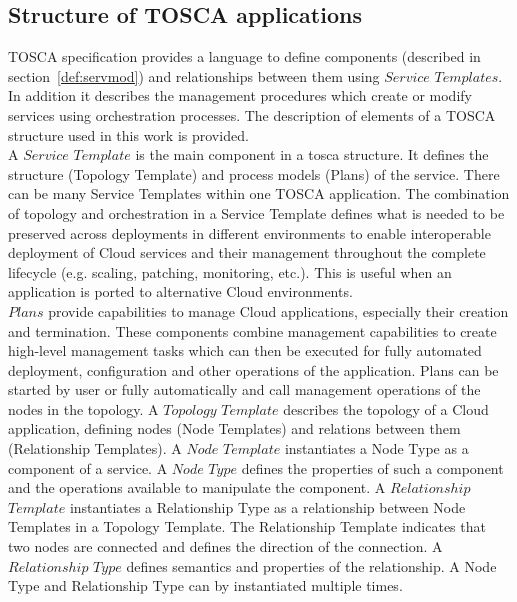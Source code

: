 \subsection*{Structure of TOSCA applications}
TOSCA specification provides a language to define components (described in section~\ref{def:servmod}) and relationships between them using $Service$ $Templates$. 
In addition it describes the management procedures which create or modify services using orchestration processes.
The description of elements of a TOSCA structure used in this work is provided. \\
A $Service$ $Template$ is the main component in a \gls{tosca} structure. 
It defines the structure (Topology Template) and process models (Plans) of the service. 
There can be many Service Templates within one TOSCA application.
The combination of topology and orchestration in a Service Template defines what is needed to be preserved across deployments in different environments to enable interoperable deployment of Cloud services and their management throughout the complete lifecycle (e.g. scaling, patching, monitoring, etc.).
This is useful when an application is ported to alternative Cloud environments.~\cite{TOSCA-v1.0_book} \\ %
$Plans$ provide capabilities to manage Cloud applications, especially their creation and termination.
These components combine management capabilities to create high-level management tasks which can then be executed for fully automated deployment, configuration and other operations of the application.
Plans can be started by user or fully automatically and call management operations of the nodes in the topology. %
A $Topology$ $Template$ describes the topology of a Cloud application, defining nodes (Node Templates) and relations between them (Relationship Templates). %
A $Node$ $Template$ instantiates a Node Type as a component of a service. 
A $Node$ $Type$ defines the properties of such a component and the operations available to manipulate the component.
A $Relationship$ $Template$ instantiates a Relationship Type as a relationship between Node Templates in a Topology Template. 
The Relationship Template indicates that two nodes are connected and defines the direction of the connection.
A $Relationship$ $Type$ defines semantics and properties of the relationship.\label{subs:reltype} %
A Node Type and Relationship Type can by instantiated multiple times.
